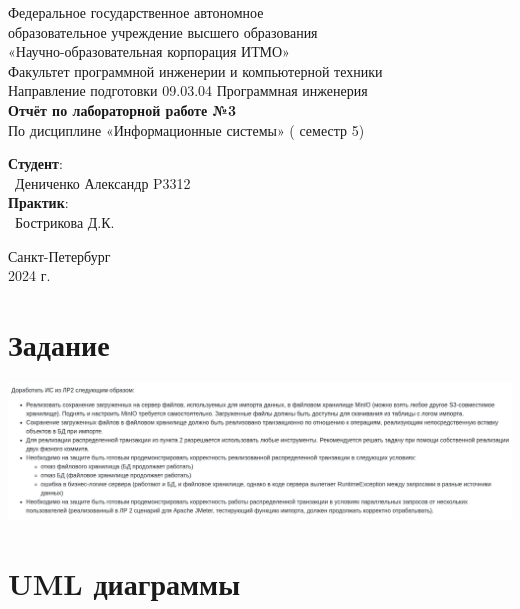 \documentclass{article}
\begin{document}
\begin{center}
    \Large
    Федеральное государственное автономное \\
    образовательное учреждение высшего образования \\ 
    «Научно-образовательная корпорация ИТМО»\\
    \vspace{0.5cm}
    \large
    Факультет программной инженерии и компьютерной техники \\
    Направление подготовки 09.03.04 Программная инженерия \\
    \vspace{1cm}
    \Large
    \textbf{Отчёт по лабораторной работе №3} \\
    По дисциплине «Информационные системы» ( семестр 5)\\
    \large
    \vspace{8cm}

    \begin{minipage}{.33\textwidth}
    \end{minipage}
    \hfill
    \begin{minipage}{.4\textwidth}
    
        \textbf{Студент}: \vspace{.1cm} \\
        \ Дениченко Александр P3312\\
        \textbf{Практик}:  \\
        \ Бострикова Д.К.
    \end{minipage}
    \vfill
Санкт-Петербург\\ 2024 г.
\end{center}
\pagestyle{empty}
\newpage
\pagestyle{plain}

\section*{Задание}
\begin{center}
    \includegraphics[width=.9\textwidth]{image}
\end{center}


\section{UML диаграммы}
\end{document}
